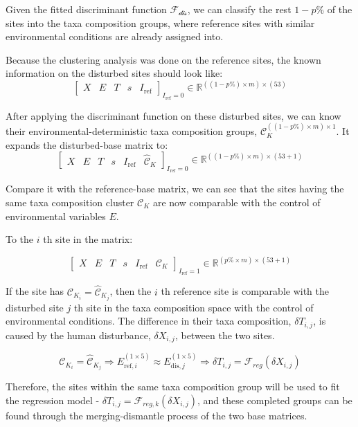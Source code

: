 Given the fitted discriminant function \(\mathcal{F_{\text{dis}}}\), we can classify the rest \(1 - p\%\) of the sites
into the taxa composition groups, where reference sites with similar environmental conditions are already assigned into.

Because the clustering analysis was done on the reference sites, the known information on the disturbed sites should look like:
\[
\left[
\begin{array}{ccccc}
X & E & T & s & I_{\text{ref}}
\end{array}
\right]_{I_{\text{ref}} = 0}
\in
\mathbb{R}^{((1 - p\%) \times m) \times (53)}
\]

After applying the discriminant function on these disturbed sites, 
we can know their environmental-deterministic taxa composition groups,
\(\mathcal{C}_K^{((1 - p\%) \times m) \times 1}\).
It expands the disturbed-base matrix to:
\[\left[
\begin{array}{cccccc}
X & E & T & s & I_{\text{ref}} & \mathcal{\hat C}_K
\end{array}
\right]_{I_{\text{ref}} = 0}
\in
\mathbb{R}^{((1 - p\%) \times m) \times (53 + 1)}
\]

Compare it with the reference-base matrix,
we can see that the sites having the same taxa composition cluster \(\mathcal{C}_K\) are now comparable 
with the control of environmental variables \(E\).

To the \(i\) th site in the matrix:

\[\left[
\begin{array}{cccccc}
X & E & T & s & I_{\text{ref}} & \mathcal{C}_K
\end{array}
\right]_{I_{\text{ref}} = 1}
\in
\mathbb{R}^{(p\% \times m) \times (53 + 1)}
\]

If the site has \(\mathcal{C}_{K_i} = \mathcal{\hat C}_{K_j}\), then the \(i\) th reference site is comparable with the disturbed site \(j\) th site in the taxa composition space with the control of environmental conditions.
The difference in their taxa composition, \(\delta T_{i,j}\), is caused by the human disturbance, \(\delta X_{i,j}\), between the two sites.

\[
\mathcal{C}_{K_i} = \mathcal{\hat C}_{K_j} \Rightarrow E_{\text{ref}, i}^{(1 \times 5)} \approx E_{\text{dis}, j}^{(1 \times 5)} \Rightarrow \delta T_{i,j} = \mathcal{F}_{reg}(\delta X_{i,j})
\]

Therefore, the sites within the same taxa composition group will be used to fit the regression model - \(\delta T_{i,j} = \mathcal{F}_{reg, k}(\delta X_{i,j})\), 
and these completed groups can be found through
the merging-dismantle process of the two base matrices.

